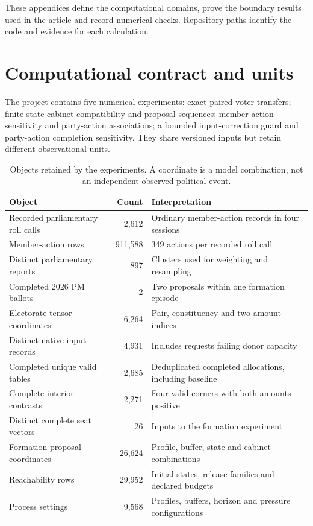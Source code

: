 These appendices define the computational domains, prove the boundary results used in the article and record numerical checks. Repository paths identify the code and evidence for each calculation.

\section{Computational contract and units}

The project contains five numerical experiments: exact paired voter transfers; finite-state cabinet compatibility and proposal sequences; member-action sensitivity and party-action associations; a bounded input-correction guard and party-action completion sensitivity. They share versioned inputs but retain different observational units.

\begin{table}[htbp]\centering
\caption{Objects retained by the experiments. A coordinate is a model combination, not an independent observed political event.}
\begin{tabularx}{\linewidth}{l r X}
\toprule
Object & Count & Interpretation\\
\midrule
Recorded parliamentary roll calls & 2,612 & Ordinary member-action records in four sessions\\
Member-action rows & 911,588 & 349 actions per recorded roll call\\
Distinct parliamentary reports & 897 & Clusters used for weighting and resampling\\
Completed 2026 PM ballots & 2 & Two proposals within one formation episode\\
Electorate tensor coordinates & 6,264 & Pair, constituency and two amount indices\\
Distinct native input records & 4,931 & Includes requests failing donor capacity\\
Completed unique valid tables & 2,685 & Deduplicated completed allocations, including baseline\\
Complete interior contrasts & 2,271 & Four valid corners with both amounts positive\\
Distinct complete seat vectors & 26 & Inputs to the formation experiment\\
Formation proposal coordinates & 26,624 & Profile, buffer, state and cabinet combinations\\
Reachability rows & 29,952 & Initial states, release families and declared budgets\\
Process settings & 9,568 & Profiles, buffers, horizon and pressure configurations\\
\bottomrule
\end{tabularx}
\end{table}

